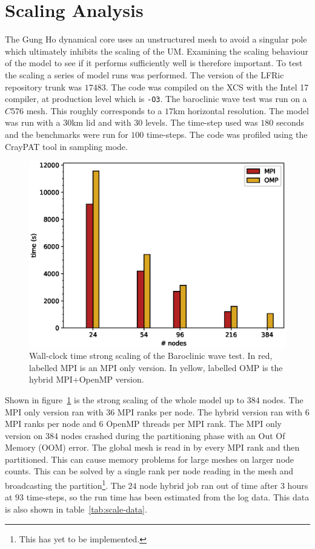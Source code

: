 \section{\label{sec:scale}Scaling Analysis}
The Gung Ho dynamical core uses an unstructured mesh to avoid a
singular pole which ultimately inhibits the scaling of the
UM. Examining the scaling behaviour of the model to see if it
performs sufficiently well is therefore important. To test the scaling a series
of model runs was performed. The version of the LFRic repository trunk
was $17483$. The code was compiled on the XCS with the Intel 17
compiler, at production level which is \verb+-O3+. The baroclinic wave
test was run on a $C576$ mesh. This roughly corresponds to a $17$km
horizontal resolution. The model was run with a $30$km lid and with
$30$ levels.  The time-step used was $180$
seconds and the benchmarks were run for $100$ time-steps. The code was
profiled using the CrayPAT tool in sampling mode. 

\begin{figure}
\centering\includegraphics[width=1.0\linewidth]{figs/wc-scale.eps}
\caption{\label{fig:wc_scale}Wall-clock time strong scaling of the 
  Baroclinic wave test. In red, labelled MPI is an MPI only
  version. In yellow, labelled OMP is the hybrid MPI+OpenMP version.}
\end{figure} 

Shown in figure~\ref{fig:wc_scale} is the strong scaling of the whole
model up to $384$ nodes. The MPI only version ran with $36$ MPI ranks
per node. The hybrid version ran with $6$ MPI ranks per node and $6$
OpenMP threads per MPI rank. The MPI only version on $384$ nodes
crashed during the partitioning phase with an Out Of Memory (OOM)
error. The global mesh is read in by every MPI rank and then
partitioned. This can cause memory problems for large meshes on larger
node counts. This can be solved by a single rank per node reading in
the mesh and broadcasting the partition\footnote{This has yet to be implemented.}. The $24$ node hybrid job ran
out of time after 3 hours at $93$ time-steps, so the run time has been
estimated from the log data. This data is also shown in
table~\ref{tab:scale-data}.

